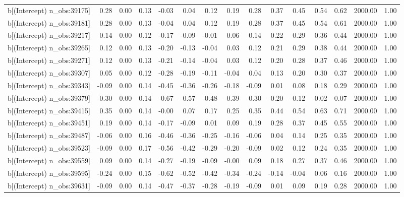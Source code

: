 \begin{table}[ht]
\begin{tabular}{rrrrrrrrrrrrrrr}
  b[(Intercept) n\_obs:39175] & 0.28 & 0.00 & 0.13 & -0.03 & 0.04 & 0.12 & 0.19 & 0.28 & 0.37 & 0.45 & 0.54 & 0.62 & 2000.00 & 1.00 \\ 
  b[(Intercept) n\_obs:39181] & 0.28 & 0.00 & 0.13 & -0.04 & 0.04 & 0.12 & 0.19 & 0.28 & 0.37 & 0.45 & 0.54 & 0.61 & 2000.00 & 1.00 \\ 
  b[(Intercept) n\_obs:39217] & 0.14 & 0.00 & 0.12 & -0.17 & -0.09 & -0.01 & 0.06 & 0.14 & 0.22 & 0.29 & 0.36 & 0.44 & 2000.00 & 1.00 \\ 
  b[(Intercept) n\_obs:39265] & 0.12 & 0.00 & 0.13 & -0.20 & -0.13 & -0.04 & 0.03 & 0.12 & 0.21 & 0.29 & 0.38 & 0.44 & 2000.00 & 1.00 \\ 
  b[(Intercept) n\_obs:39271] & 0.12 & 0.00 & 0.13 & -0.21 & -0.14 & -0.04 & 0.03 & 0.12 & 0.20 & 0.28 & 0.37 & 0.46 & 2000.00 & 1.00 \\ 
  b[(Intercept) n\_obs:39307] & 0.05 & 0.00 & 0.12 & -0.28 & -0.19 & -0.11 & -0.04 & 0.04 & 0.13 & 0.20 & 0.30 & 0.37 & 2000.00 & 1.00 \\ 
  b[(Intercept) n\_obs:39343] & -0.09 & 0.00 & 0.14 & -0.45 & -0.36 & -0.26 & -0.18 & -0.09 & 0.01 & 0.08 & 0.18 & 0.29 & 2000.00 & 1.00 \\ 
  b[(Intercept) n\_obs:39379] & -0.30 & 0.00 & 0.14 & -0.67 & -0.57 & -0.48 & -0.39 & -0.30 & -0.20 & -0.12 & -0.02 & 0.07 & 2000.00 & 1.00 \\ 
  b[(Intercept) n\_obs:39415] & 0.35 & 0.00 & 0.14 & -0.00 & 0.07 & 0.17 & 0.25 & 0.35 & 0.44 & 0.54 & 0.63 & 0.71 & 2000.00 & 1.00 \\ 
  b[(Intercept) n\_obs:39451] & 0.19 & 0.00 & 0.14 & -0.17 & -0.09 & 0.01 & 0.09 & 0.19 & 0.28 & 0.37 & 0.45 & 0.55 & 2000.00 & 1.00 \\ 
  b[(Intercept) n\_obs:39487] & -0.06 & 0.00 & 0.16 & -0.46 & -0.36 & -0.25 & -0.16 & -0.06 & 0.04 & 0.14 & 0.25 & 0.35 & 2000.00 & 1.00 \\ 
  b[(Intercept) n\_obs:39523] & -0.09 & 0.00 & 0.17 & -0.56 & -0.42 & -0.29 & -0.20 & -0.09 & 0.02 & 0.12 & 0.24 & 0.35 & 2000.00 & 1.00 \\ 
  b[(Intercept) n\_obs:39559] & 0.09 & 0.00 & 0.14 & -0.27 & -0.19 & -0.09 & -0.00 & 0.09 & 0.18 & 0.27 & 0.37 & 0.46 & 2000.00 & 1.00 \\ 
  b[(Intercept) n\_obs:39595] & -0.24 & 0.00 & 0.15 & -0.62 & -0.52 & -0.42 & -0.34 & -0.24 & -0.14 & -0.04 & 0.06 & 0.16 & 2000.00 & 1.00 \\ 
  b[(Intercept) n\_obs:39631] & -0.09 & 0.00 & 0.14 & -0.47 & -0.37 & -0.28 & -0.19 & -0.09 & 0.01 & 0.09 & 0.19 & 0.28 & 2000.00 & 1.00 \\ 

\end{tabular}
\end{table}
